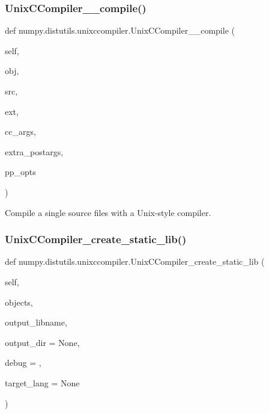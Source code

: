 \subsubsection{\texorpdfstring{Unix\+C\+Compiler\+\_\+\+\_\+compile()}{UnixCCompiler\_\_compile()}}
{\footnotesize\ttfamily def numpy.\+distutils.\+unixccompiler.\+Unix\+C\+Compiler\+\_\+\+\_\+compile (\begin{DoxyParamCaption}\item[{}]{self,  }\item[{}]{obj,  }\item[{}]{src,  }\item[{}]{ext,  }\item[{}]{cc\+\_\+args,  }\item[{}]{extra\+\_\+postargs,  }\item[{}]{pp\+\_\+opts }\end{DoxyParamCaption})}

\begin{DoxyVerb}Compile a single source files with a Unix-style compiler.\end{DoxyVerb}
 \mbox{\label{namespacenumpy_1_1distutils_1_1unixccompiler_ad9c1e957f5cc71b1a32be90196b55e43}} 
\subsubsection{\texorpdfstring{Unix\+C\+Compiler\+\_\+create\+\_\+static\+\_\+lib()}{UnixCCompiler\_create\_static\_lib()}}
{\footnotesize\ttfamily def numpy.\+distutils.\+unixccompiler.\+Unix\+C\+Compiler\+\_\+create\+\_\+static\+\_\+lib (\begin{DoxyParamCaption}\item[{}]{self,  }\item[{}]{objects,  }\item[{}]{output\+\_\+libname,  }\item[{}]{output\+\_\+dir = {\ttfamily None},  }\item[{}]{debug = {},  }\item[{}]{target\+\_\+lang = {\ttfamily None} }\end{DoxyParamCaption})}

